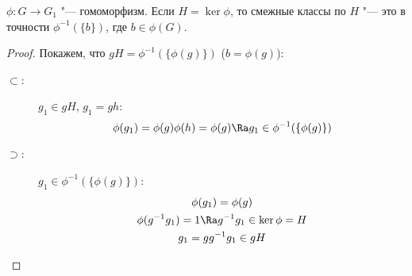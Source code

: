 \begin{lemma}
	$\phi\colon G \to G_1$ "--- гомоморфизм.
	Если $H = \ker \phi$, то смежные классы по $H$ "--- это в точности $\phi^{-1}(\{b\})$, где $b \in \phi(G)$.
\end{lemma}
\begin{proof}
	Покажем, что $gH = \phi^{-1}(\{\phi(g)\})$ ($b = \phi(g)$):
	\begin{description}
	\item[$\subset$:]
		$g_1 \in gH$, $g_1 = gh$:
		\[ \phi(g_1) = \phi(g)\phi(h) = \phi(g) \Ra g_1 \in \phi^{-1}(\{\phi(g)\}) \]

	\item[$\supset$:]
		$g_1 \in \phi^{-1}(\{\phi(g)\})$:
		\begin{gather*}
			\phi(g_1) = \phi(g) \\
			\phi(g^{-1}g_1) = 1 \Ra g^{-1}g_1 \in \ker \phi = H \\
			g_1 = gg^{-1}g_1 \in gH
		\end{gather*}
	\end{description}
\end{proof}


